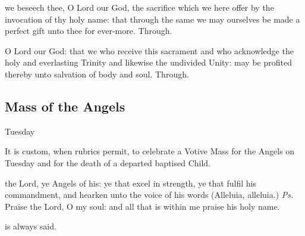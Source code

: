 
\vspace{-0.25\baselineskip}

\secret

\vspace{-0.1\baselineskip}

 we beseech thee, O Lord our God, the sacrifice which we here offer by the invocation of thy holy name: that through the same we may ourselves be made a perfect gift unto thee for ever-more. Through.


\vspace{-0.25\baselineskip}

\postcommunion

\vspace{-0.1\baselineskip}

 O Lord our God: that we who receive this sacrament and who acknowledge the holy and everlasting Trinity and likewise the undivided Unity: may be profited thereby unto salvation of body and soul. Through.


\clearpage
\subsection{Mass of the Angels}\label{MassOfTheAngels}
\begin{inhead}
	Tuesday
\end{inhead}
\begin{rubric}
	    It is custom, when rubrics permit, to celebrate a Votive Mass for the Angels on Tuesday and for the death of a departed baptised Child.
\end{rubric}
\introit
{} the Lord, ye Angels of his: ye that excel in strength, ye that fulfil his commandment, and hearken unto the voice of his words (Alleluia, alleluia.) \textit{Ps.} Praise the Lord, O my soul: and all that is within me praise his holy name.

\begin{rubric}
     is always said.
\end{rubric}


